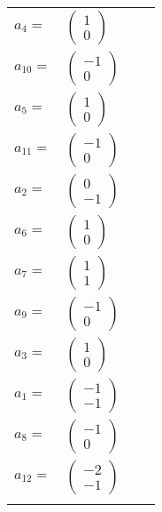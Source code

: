 \documentclass[1p]{elsarticle_modified}
\theoremstyle{definition}
\begin{document}
\begin{tabular}{m{7pt} m{180pt} m{7pt} m{180pt} }
\flushright $a_{4}=$&$\begin{pmatrix}1\\0\end{pmatrix}$ \\
\flushright $a_{10}=$&$\begin{pmatrix}-1\\0\end{pmatrix}$ \\
\flushright $a_{5}=$&$\begin{pmatrix}1\\0\end{pmatrix}$ \\
\flushright $a_{11}=$&$\begin{pmatrix}-1\\0\end{pmatrix}$ \\
\flushright $a_{2}=$&$\begin{pmatrix}0\\-1\end{pmatrix}$ \\
\flushright $a_{6}=$&$\begin{pmatrix}1\\0\end{pmatrix}$ \\
\flushright $a_{7}=$&$\begin{pmatrix}1\\1\end{pmatrix}$ \\
\flushright $a_{9}=$&$\begin{pmatrix}-1\\0\end{pmatrix}$ \\
\flushright $a_{3}=$&$\begin{pmatrix}1\\0\end{pmatrix}$ \\
\flushright $a_{1}=$&$\begin{pmatrix}-1\\-1\end{pmatrix}$ \\
\flushright $a_{8}=$&$\begin{pmatrix}-1\\0\end{pmatrix}$ \\
\flushright $a_{12}=$&$\begin{pmatrix}-2\\-1\end{pmatrix}$\\&\end{tabular}
\end{document}
